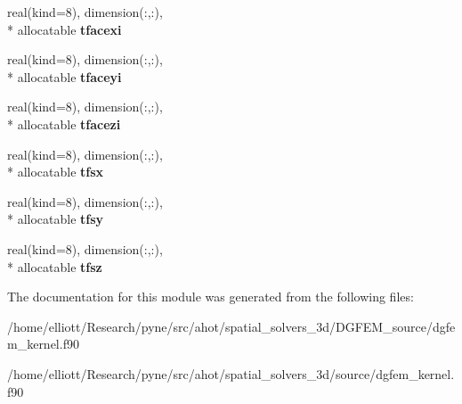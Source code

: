 \begin{DoxyCompactItemize}
\item 
\hypertarget{classdgfem__kernel__module_af42dd3f4f583d8432912c15f2a5cf3dd}{real(kind=8), dimension(\-:,\-:), \\*
allocatable {\bfseries tfacexi}}\label{classdgfem__kernel__module_af42dd3f4f583d8432912c15f2a5cf3dd}

\item 
\hypertarget{classdgfem__kernel__module_a68ae2f84e123935b49b31f7919328a05}{real(kind=8), dimension(\-:,\-:), \\*
allocatable {\bfseries tfaceyi}}\label{classdgfem__kernel__module_a68ae2f84e123935b49b31f7919328a05}

\item 
\hypertarget{classdgfem__kernel__module_aba37bea00bccf7932a71e8373227a826}{real(kind=8), dimension(\-:,\-:), \\*
allocatable {\bfseries tfacezi}}\label{classdgfem__kernel__module_aba37bea00bccf7932a71e8373227a826}

\item 
\hypertarget{classdgfem__kernel__module_a241926bb840141b2c22f1a70d8c337af}{real(kind=8), dimension(\-:,\-:), \\*
allocatable {\bfseries tfsx}}\label{classdgfem__kernel__module_a241926bb840141b2c22f1a70d8c337af}

\item 
\hypertarget{classdgfem__kernel__module_a92037d1eb02c4c4ba55ecfbb1577fa32}{real(kind=8), dimension(\-:,\-:), \\*
allocatable {\bfseries tfsy}}\label{classdgfem__kernel__module_a92037d1eb02c4c4ba55ecfbb1577fa32}

\item 
\hypertarget{classdgfem__kernel__module_ae9e5a881069ba9b29b234b4e39d5688c}{real(kind=8), dimension(\-:,\-:), \\*
allocatable {\bfseries tfsz}}\label{classdgfem__kernel__module_ae9e5a881069ba9b29b234b4e39d5688c}

\end{DoxyCompactItemize}


The documentation for this module was generated from the following files\-:\begin{DoxyCompactItemize}
\item 
/home/elliott/\-Research/pyne/src/ahot/spatial\-\_\-solvers\-\_\-3d/\-D\-G\-F\-E\-M\-\_\-source/dgfem\-\_\-kernel.\-f90\item 
/home/elliott/\-Research/pyne/src/ahot/spatial\-\_\-solvers\-\_\-3d/source/dgfem\-\_\-kernel.\-f90\end{DoxyCompactItemize}

